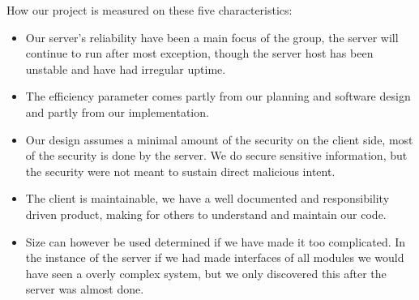  How our project is measured on these five characteristics:
 \begin{itemize}
 	\item Our server's reliability have been a main focus of the group, the server will continue to run after most exception, though the server host has been unstable and have had irregular uptime.
 	\item The efficiency parameter comes partly from our planning and software design and partly from our implementation.
 	\item Our design assumes a minimal amount of the security on the client side, most of the security is done by the server. We do secure sensitive information, but the security were not meant to sustain direct malicious intent.
 	\item The client is maintainable, we have a well documented and responsibility driven product, making for others to understand and maintain our code. 
 	\item Size can however be used determined if we have made it too complicated. In the instance of the server if we had made interfaces of all modules we would have seen a overly complex system, but we only discovered this after the server was almost done. 
 \end{itemize}